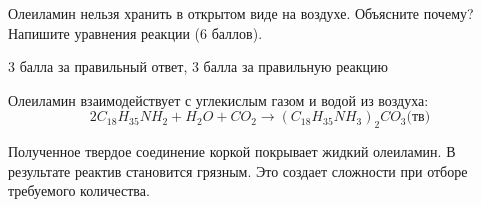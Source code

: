 
Олеиламин нельзя хранить в открытом виде на воздухе. Объясните почему? Напишите уравнения реакции (6 баллов).

3 балла за правильный ответ, 3 балла за правильную реакцию

\explanationSection

Олеиламин взаимодействует с углекислым газом и водой из воздуха:
$$2C_{18}H_{35}NH_2 + H_2O + CO_2 \rightarrow (C_{18}H_{35}NH_3)_2CO_3\text{(тв)}$$

Полученное твердое соединение коркой покрывает жидкий олеиламин. В результате реактив становится грязным. Это создает сложности при отборе требуемого количества.